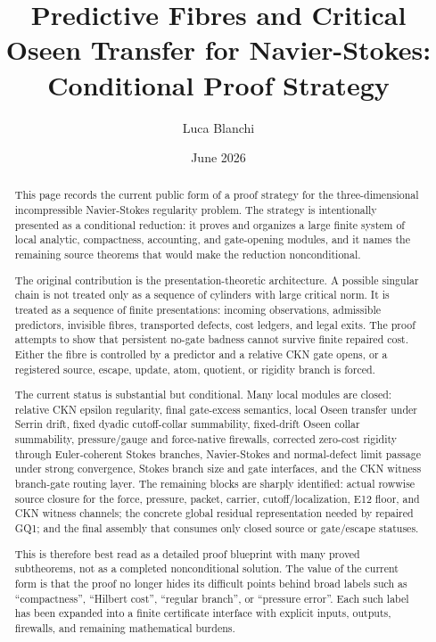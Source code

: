 \documentclass[11pt]{article}
\title{Predictive Fibres and Critical Oseen Transfer for Navier-Stokes: Conditional Proof Strategy}
\author{Luca Blanchi}
\date{June 2026}
\begin{document}
\maketitle
\begin{abstract}

This page records the current public form of a proof strategy for the three-dimensional incompressible Navier-Stokes regularity problem. The strategy is intentionally presented as a conditional reduction: it proves and organizes a large finite system of local analytic, compactness, accounting, and gate-opening modules, and it names the remaining source theorems that would make the reduction nonconditional.

The original contribution is the presentation-theoretic architecture. A possible singular chain is not treated only as a sequence of cylinders with large critical norm. It is treated as a sequence of finite presentations: incoming observations, admissible predictors, invisible fibres, transported defects, cost ledgers, and legal exits. The proof attempts to show that persistent no-gate badness cannot survive finite repaired cost. Either the fibre is controlled by a predictor and a relative CKN gate opens, or a registered source, escape, update, atom, quotient, or rigidity branch is forced.

The current status is substantial but conditional. Many local modules are closed: relative CKN epsilon regularity, final gate-excess semantics, local Oseen transfer under Serrin drift, fixed dyadic cutoff-collar summability, fixed-drift Oseen collar summability, pressure/gauge and force-native firewalls, corrected zero-cost rigidity through Euler-coherent Stokes branches, Navier-Stokes and normal-defect limit passage under strong convergence, Stokes branch size and gate interfaces, and the CKN witness branch-gate routing layer. The remaining blocks are sharply identified: actual rowwise source closure for the force, pressure, packet, carrier, cutoff/localization, E12 floor, and CKN witness channels; the concrete global residual representation needed by repaired GQ1; and the final assembly that consumes only closed source or gate/escape statuses.

This is therefore best read as a detailed proof blueprint with many proved subtheorems, not as a completed nonconditional solution. The value of the current form is that the proof no longer hides its difficult points behind broad labels such as ``compactness'', ``Hilbert cost'', ``regular branch'', or ``pressure error''. Each such label has been expanded into a finite certificate interface with explicit inputs, outputs, firewalls, and remaining mathematical burdens.

\end{abstract}
\end{document}
